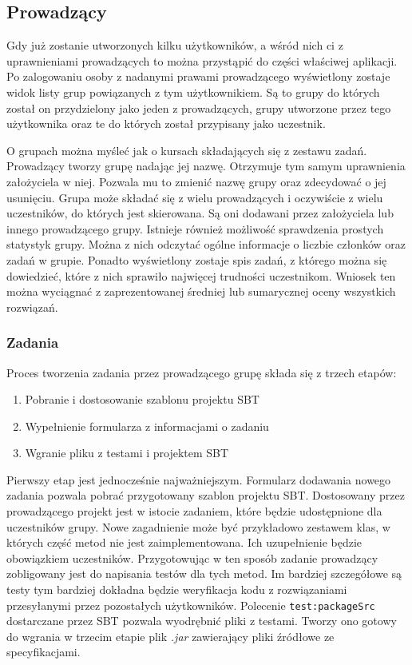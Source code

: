 \documentclass[brudnopis]{xmgr}
\begin{document}
\subsection{Prowadzący}

Gdy już zostanie utworzonych kilku użytkowników, a wśród nich ci z uprawnieniami prowadzących to można przystąpić do części właściwej aplikacji. Po zalogowaniu osoby z nadanymi prawami prowadzącego wyświetlony zostaje widok listy grup powiązanych z tym użytkownikiem. Są to grupy do których został on przydzielony jako jeden z prowadzących, grupy utworzone przez tego użytkownika oraz te do których został przypisany jako uczestnik. 

O grupach można myśleć jak o kursach składających się z zestawu zadań. Prowadzący tworzy grupę nadając jej nazwę. Otrzymuje tym samym uprawnienia założyciela w niej. Pozwala mu to zmienić nazwę grupy oraz zdecydować o jej usunięciu. Grupa może składać się z wielu prowadzących i oczywiście z wielu uczestników, do których jest skierowana. Są oni dodawani przez założyciela lub innego prowadzącego grupy. Istnieje również możliwość sprawdzenia prostych statystyk grupy. Można z nich odczytać ogólne informacje o liczbie członków oraz zadań w grupie. Ponadto wyświetlony zostaje spis zadań, z którego można się dowiedzieć, które z nich sprawiło najwięcej trudności uczestnikom. Wniosek ten można wyciągnać z zaprezentowanej średniej lub sumarycznej oceny wszystkich rozwiązań.

\subsubsection{Zadania}

Proces tworzenia zadania przez prowadzącego grupę składa się z trzech etapów: 

\begin{enumerate}
\item Pobranie i dostosowanie szablonu projektu SBT
\item Wypełnienie formularza z informacjami o zadaniu
\item Wgranie pliku z testami i projektem SBT
\end{enumerate}

Pierwszy etap jest jednocześnie najważniejszym. Formularz dodawania nowego zadania pozwala pobrać przygotowany szablon projektu SBT. Dostosowany przez prowadzącego projekt jest w istocie zadaniem, które będzie udostępnione dla uczestników grupy. Nowe zagadnienie może być przykładowo zestawem klas, w których część metod nie jest zaimplementowana. Ich uzupełnienie będzie obowiązkiem uczestników. Przygotowując w ten sposób zadanie prowadzący zobligowany jest do napisania testów dla tych metod. Im bardziej szczegółowe są testy tym bardziej dokładna będzie weryfikacja kodu z rozwiązaniami przesyłanymi przez pozostałych użytkowników. Polecenie \texttt{test:packageSrc} dostarczane przez SBT pozwala wyodrębnić pliki z testami. Tworzy ono gotowy do wgrania w trzecim etapie plik \emph{.jar} zawierający pliki źródłowe ze specyfikacjami. 
\end{document}
